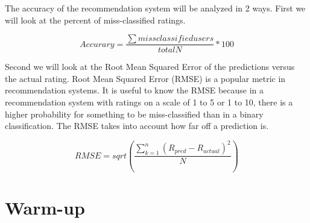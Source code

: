 \documentclass{report}
\begin{document}
The accuracy of the recommendation system will be analyzed in 2 ways.
First we will look at the percent of miss-classified ratings.

\begin{equation}
	Accurary =  \frac{\sum miss classified users}{total N} * 100
\end{equation}

Second we will look at the Root Mean Squared Error of the predictions versus the actual rating. 
Root Mean Squared Error (RMSE) is a popular metric in recommendation systems.
It is useful to know the RMSE because in a recommendation system with ratings on a scale of 1 to 5 or 1 to 10, there is a higher probability for something to be miss-classified than in a binary classification. 
The RMSE takes into account how far off a prediction is.

\begin{equation}
RMSE = sqrt(\frac{\sum_{k=1}^n(R_{pred} - R_{actual})^2}{N})
\end{equation}

\section*{Warm-up}
\end{document}

